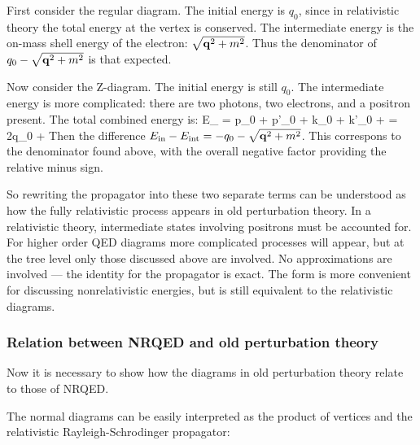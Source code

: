 First consider the regular diagram.  The initial energy is $q_0$, since in relativistic theory the total energy at the vertex is conserved.  The intermediate energy is the on-mass shell energy of the electron: $\sqrt{\mathbf{q}^2+ m^2}$.  Thus the denominator of $q_0 - \sqrt{\mathbf{q}^2+ m^2}$ is that expected.

Now consider the Z-diagram.  The initial energy is still $q_0$.  The intermediate energy is more complicated: there are two photons, two electrons, and a positron present.  The total combined energy is:
\beq
	E_ = p_0 + p'_0 + k_0 + k'_0 +  = 2q_0 +  
\eeq
Then the difference $E_\text{in} - E_\text{int} = -q_0 - \sqrt{\mathbf{q}^2 + m^2}$.  This correspons to the denominator found above, with the overall negative factor providing the relative minus sign.

So rewriting the propagator into these two separate terms can be understood as how the fully relativistic process appears in old perturbation theory.  In a relativistic theory, intermediate states involving positrons must be accounted for.  For higher order QED diagrams more complicated processes will appear, but at the tree level only those discussed above are involved.  No approximations are involved --- the identity for the propagator is exact.  The form is more convenient for discussing nonrelativistic energies, but is still equivalent to the relativistic diagrams.






\subsubsection{Relation between NRQED and old perturbation theory}
Now it is necessary to show how the diagrams in old perturbation theory relate to those of NRQED.  

The normal diagrams can be easily interpreted as the product of vertices and the relativistic Rayleigh-Schrodinger propagator:

